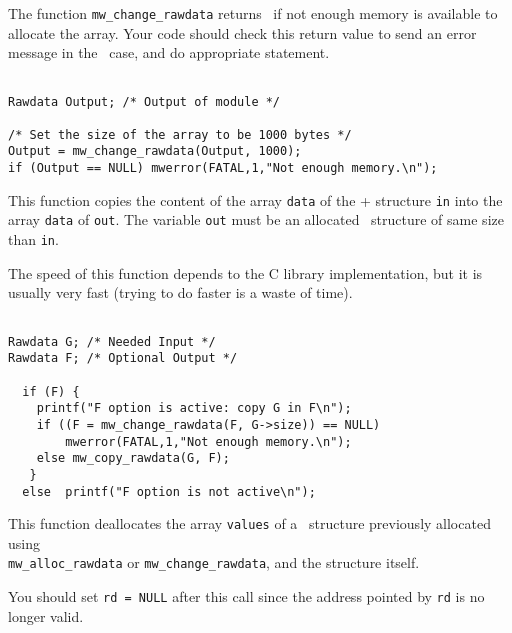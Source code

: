 The function \verb+mw_change_rawdata+ returns \Null\ if not enough memory is available to allocate the array. 
Your code should check this return value to 
send an error message in the \Null\ case, and do appropriate statement.

\Next
\Example
\begin{verbatim}

Rawdata Output; /* Output of module */

/* Set the size of the array to be 1000 bytes */
Output = mw_change_rawdata(Output, 1000);
if (Output == NULL) mwerror(FATAL,1,"Not enough memory.\n");
\end{verbatim}

\newpage %

\Description
This function copies the content of the array \verb+data+ of the \rawdata+ structure \verb+in+ into the array \verb+data+ of \verb+out+.
The variable \verb+out+ must be an allocated \rawdata\ structure of same
size than \verb+in+.

The speed of this function depends to the C library implementation, but it is
usually very fast (trying to do faster is a waste of time).

\Next
\Example
\begin{verbatim}

Rawdata G; /* Needed Input */
Rawdata F; /* Optional Output */

  if (F) {
    printf("F option is active: copy G in F\n");
    if ((F = mw_change_rawdata(F, G->size)) == NULL)
        mwerror(FATAL,1,"Not enough memory.\n");
    else mw_copy_rawdata(G, F);
   }
  else  printf("F option is not active\n");
\end{verbatim}

\newpage %

\Description
This function deallocates the array \verb+values+ of a \rawdata\ structure previously allocated using\\
 \verb+mw_alloc_rawdata+ or \verb+mw_change_rawdata+, and the structure itself. 

You should set \verb+rd = NULL+ after this call since the address pointed
by \verb+rd+ is no longer valid.

